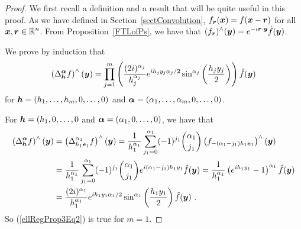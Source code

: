 \begin{proof}
We first recall a definition and a result that will be quite useful in
this proof.  As we have defined in Section~\ref{sectConvolution},
$f_{{\bm{r}}}({\bm{x}}) = f({\bm{x}}- {\bm{r}})$ for all
$\displaystyle {\bm{x}},{\bm{r}} \in \mathbb{R}^n$.
From Proposition~\ref{FTLofPs}, we have that
$\displaystyle (f_{{\bm{r}}})^\wedge({\bm{y}}) =
e^{-i {\bm{r}}\cdot{\bm{y}}} \hat{f}({\bm{y}})$.

We prove by induction that
\begin{equation} \label{ellRegProp3Eq2}
\left(\Delta^{{\bm{\alpha}}}_{{\bm{h}}} f\right)^\wedge({\bm{y}})
= \prod_{j=1}^m \left(\frac{(2i)^{\alpha_j}}
{h_j^{\alpha_j}} e^{i h_j y_j \alpha_j/2}
\sin^{\alpha_j}\left(\frac{h_j y_j}{2}\right) \right)\hat{f}({\bm{y}})
\end{equation}
for ${\bm{h}} = (h_1,\ldots,h_m,0,\ldots,0)$ and
${\bm{\alpha}} = (\alpha_1,\ldots,\alpha_m,0,\ldots,0)$.

For ${\bm{h}} = (h_1,0,\ldots,0$ and ${\bm{\alpha}} = (\alpha_1,0,\ldots,0)$,
we have that
\begin{align*}
\left(\Delta^{{\bm{\alpha}}}_{{\bm{h}}} f \right)^\wedge({\bm{y}})
&= \left(\Delta^{\alpha_1}_{h_1 {\bm{e}}_1} f \right)^\wedge({\bm{y}})
= \frac{1}{h_1^{\alpha_1}} \sum_{j_1=0}^{\alpha_1} (-1)^{j_1}
\binom{\alpha_1}{j_1}
\left(f_{-(\alpha_1-j_1)h_1 {\bm{e}}_1}\right)^\wedge({\bm{y}}) \\
&= \frac{1}{h_1^{\alpha_1}} \sum_{j_1=0}^{\alpha_1} (-1)^{j_1}
\binom{\alpha_1}{j_1} e^{i(\alpha_1-j_1) h_1 y_1} \hat{f}({\bm{y}})
= \frac{1}{h_1^{\alpha_1}} \left(e^{i h_1 y_1} - 1\right)^{\alpha_1}
\hat{f}({\bm{y}}) \\
&= \frac{(2i)^{\alpha_1}}{h_1^{\alpha_1}} e^{i h_1 y_1 \alpha_1/2}
\sin^{\alpha_1}\left(\frac{h_1 y_1}{2}\right) \hat{f}({\bm{y}}) \ .
\end{align*}
So (\ref{ellRegProp3Eq2}) is true for $m=1$.


\end{proof}
